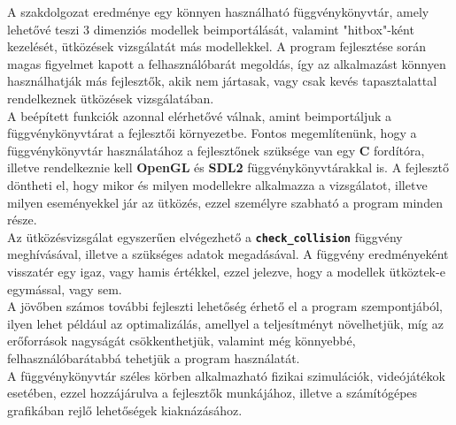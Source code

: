
A szakdolgozat eredménye egy könnyen használható függvénykönyvtár, amely lehetővé teszi 3 dimenziós modellek beimportálását, valamint "hitbox"-ként kezelését, ütközések vizsgálatát más modellekkel. A program fejlesztése során magas figyelmet kapott a felhasználóbarát megoldás, így az alkalmazást könnyen használhatják más fejlesztők, akik nem jártasak, vagy csak kevés tapasztalattal rendelkeznek ütközések vizsgálatában.\\

A beépített funkciók azonnal elérhetővé válnak, amint beimportáljuk a függvénykönyvtárat a fejlesztői környezetbe. Fontos megemlítenünk, hogy a függvénykönyvtár használatához a fejlesztőnek szüksége van egy \textbf{C} fordítóra, illetve rendelkeznie kell \textbf{OpenGL} és \textbf{SDL2} függvénykönyvtárakkal is. A fejlesztő döntheti el, hogy mikor és milyen modellekre alkalmazza a vizsgálatot, illetve milyen eseményekkel jár az ütközés, ezzel személyre szabható a program minden része.\\

Az ütközésvizsgálat egyszerűen elvégezhető a \textbf{\texttt{check\_collision}} függvény meghívásával, illetve a szükséges adatok megadásával. A függvény eredményeként visszatér egy igaz, vagy hamis értékkel, ezzel jelezve, hogy a modellek ütköztek-e egymással, vagy sem.\\

A jövőben számos további fejleszti lehetőség érhető el a program szempontjából, ilyen lehet például az optimalizálás, amellyel a teljesítményt növelhetjük, míg az erőforrások nagyságát csökkenthetjük, valamint még könnyebbé, felhasználóbarátabbá tehetjük a program használatát.\\

A függvénykönyvtár széles körben alkalmazható fizikai szimulációk, videójátékok esetében, ezzel hozzájárulva a fejlesztők munkájához, illetve a számítógépes grafikában rejlő lehetőségek kiaknázásához.